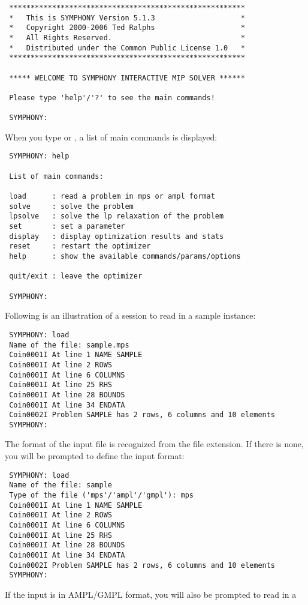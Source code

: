 {\color{Brown}
\begin{verbatim}
 *******************************************************
 *   This is SYMPHONY Version 5.1.3                    *
 *   Copyright 2000-2006 Ted Ralphs                    *
 *   All Rights Reserved.                              *
 *   Distributed under the Common Public License 1.0   *
 *******************************************************

 ***** WELCOME TO SYMPHONY INTERACTIVE MIP SOLVER ******

 Please type 'help'/'?' to see the main commands!

 SYMPHONY:
\end{verbatim}
}
When you type  or , a list of main commands is displayed:
{\color{Brown}
\begin{verbatim}
 SYMPHONY: help

 List of main commands:

 load      : read a problem in mps or ampl format
 solve     : solve the problem
 lpsolve   : solve the lp relaxation of the problem
 set       : set a parameter
 display   : display optimization results and stats
 reset     : restart the optimizer
 help      : show the available commands/params/options

 quit/exit : leave the optimizer

 SYMPHONY:
\end{verbatim}
}
Following is an illustration of a session to read in a sample instance:
{\color{Brown}
\begin{verbatim}
 SYMPHONY: load 
 Name of the file: sample.mps
 Coin0001I At line 1 NAME SAMPLE
 Coin0001I At line 2 ROWS
 Coin0001I At line 6 COLUMNS
 Coin0001I At line 25 RHS
 Coin0001I At line 28 BOUNDS
 Coin0001I At line 34 ENDATA
 Coin0002I Problem SAMPLE has 2 rows, 6 columns and 10 elements
 SYMPHONY: 
\end{verbatim}
}
The format of the input file is recognized from the file extension. If there is
none, you will be prompted to define the input format: 
{\color{Brown}
\begin{verbatim}
 SYMPHONY: load 
 Name of the file: sample
 Type of the file ('mps'/'ampl'/'gmpl'): mps 
 Coin0001I At line 1 NAME SAMPLE
 Coin0001I At line 2 ROWS
 Coin0001I At line 6 COLUMNS
 Coin0001I At line 25 RHS
 Coin0001I At line 28 BOUNDS
 Coin0001I At line 34 ENDATA
 Coin0002I Problem SAMPLE has 2 rows, 6 columns and 10 elements
 SYMPHONY: 
\end{verbatim}
} 
If the input is in AMPL/GMPL format, you will also be prompted to read in a
